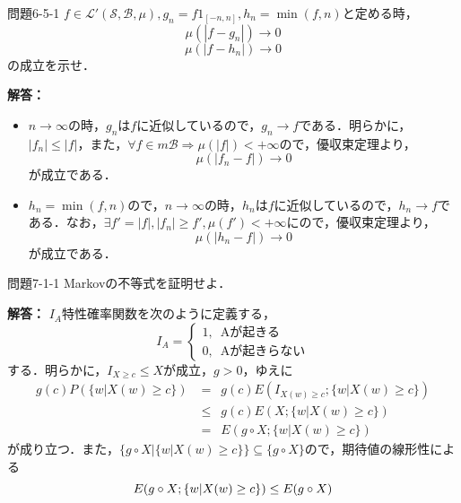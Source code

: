 \documentclass{jsarticle}
\begin{document}
\begin{itembox}[l]{問題6-5-1}
$ f  \in \mathcal{L}'(\mathcal{S},\mathcal{B},\mu),g_n = f1_{[-n,n]},h_n = \min (f,n)$と定める時，
\begin{equation*}
\mu(|f-g_n|) \to 0
\end{equation*}
\begin{equation*}
\mu(|f-h_n|) \to 0
\end{equation*}
の成立を示せ．
\end{itembox}
{\bf 解答：}
\begin{itemize}
\item $n \to \infty$の時，$g_n$は$f$に近似しているので，$g_n \to f$である．明らかに，$| f_n | \le | f |$，また，$\forall f \in m \mathcal{B} \Rightarrow \mu(|f|) < +\infty $ので，優収束定理より，
\begin{equation}
\mu(|f_n - f|) \to 0
\end{equation}
が成立である．
\item $h_n = \min(f,n)$ので，$n \to \infty$の時，$h_n$は$f$に近似しているので，$h_n \to f$である．なお，$\exists f'=|f|, |f_n| \ge f',\mu(f') < + \infty$にので，優収束定理より，
\begin{equation}
\mu(|h_n - f|) \to 0
\end{equation}
が成立である．
\end{itemize}

\begin{itembox}[l]{問題7-1-1}
Markovの不等式を証明せよ．
\end{itembox}
{\bf 解答：}
$I_A$特性確率関数を次のように定義する，
\begin{equation*}
I_A = 
\begin{cases}
1,\,\,\,\text{Aが起きる}\\
0,\,\,\,\text{Aが起きらない}
\end{cases}
\end{equation*}
する．明らかに，$I_{X \ge c} \le X$が成立，$g > 0$，ゆえに
\begin{equation*}
\begin{split}
g(c)P(\{ w | X(w) \ge c \}) &= \,\,\, g(c)E(I_{X(w)\ge c};\{ w| X(w) \ge c \})\\
&\le \,\,\, g(c)E(X;\{ w| X(w) \ge c \})\\
&= \,\,\, E(g\circ X;\{ w| X(w) \ge c \})
\end{split}
\end{equation*}
が成り立つ．また，$\{g\circ X|\{ w| X(w) \ge c \}\} \subseteq \{ g\circ X\}$ので，期待値の線形性による
\begin{equation}
E(g\circ X;\{ w| X(w) \ge c \}) \le E(g\circ X) \\
\end{equation}
\end{document}
